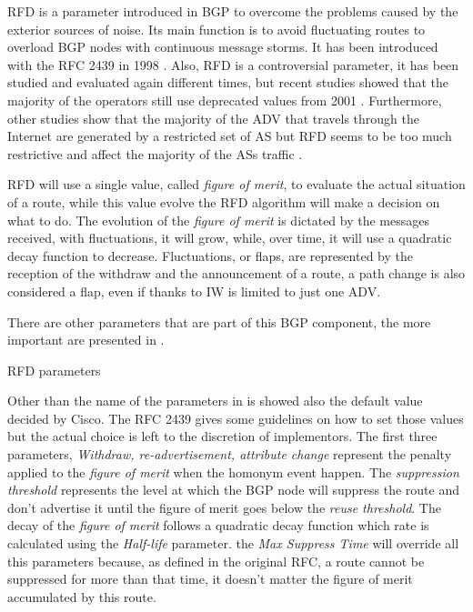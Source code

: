 \ac{RFD} is a parameter introduced in \ac{BGP} to overcome the problems caused
by the exterior sources of noise.
Its main function is to avoid fluctuating routes to overload \ac{BGP} nodes
with continuous message storms.
It has been introduced with the \ac{RFC} \num{2439} in \num{1998} \cite{rfc2439}.
Also, \ac{RFD} is a controversial parameter, it has been studied and evaluated again
different times, but recent studies showed that the majority of the operators
still use deprecated values from \num{2001} \cite{gray2020bgp}.
Furthermore, other studies show that the majority of the \ac{ADV} that travels
through the Internet are generated by a restricted set of \ac{AS} but \ac{RFD}
seems to be too much restrictive and affect the majority of the \acp{AS} traffic
\cite{pelsser2011route}.

\ac{RFD} will use a single value, called \textit{figure of merit}, to evaluate
the actual situation of a route, while this value evolve the \ac{RFD} algorithm
will make a decision on what to do.
The evolution of the \textit{figure of merit} is dictated by the messages received,
with fluctuations, it will grow, while, over time, it will use a quadratic decay
function to decrease.
Fluctuations, or flaps, are represented by the reception of the withdraw and
the announcement of a route, a path change is also considered a flap, even
if thanks to \ac{IW} is limited to just one \ac{ADV}.

There are other parameters that are part of this \ac{BGP} component, the more
important are presented in .

\begin{table}[ht]
	
	\caption{\ac{RFD} parameters}
	\label{tbl:rfd_defaults}
\end{table}

Other than the name of the parameters in  is showed also
the default value decided by Cisco.
The \ac{RFC} \num{2439} \cite{rfc2439} gives some guidelines on how to set those
values but the actual choice is left to the discretion of implementors.
The first three parameters, \textit{Withdraw, re-advertisement, attribute change}
represent the penalty applied to the \textit{figure of merit} when the homonym event
happen.
The \textit{suppression threshold} represents the level at which the \ac{BGP} node will
suppress the route and don't advertise it until the figure of merit goes
below the \textit{reuse threshold}.
The decay of the \textit{figure of merit} follows a quadratic decay function
which rate is calculated using the \textit{Half-life} parameter.
the \textit{Max Suppress Time} will override all this parameters because, as
defined in the original \ac{RFC}, a route cannot be suppressed for more than
that time, it doesn't matter the figure of merit accumulated by this route.

